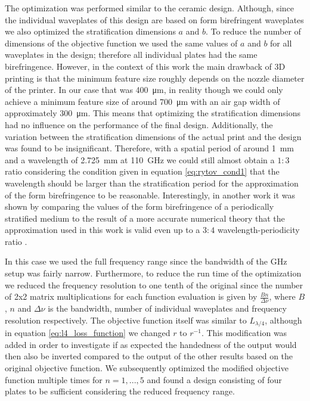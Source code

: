 The optimization was performed similar to the ceramic design. Although, since the individual waveplates of this design are based on form birefringent waveplates we also optimized the stratification dimensions $a$ and $b$. To reduce the number of dimensions of the objective function we used the same values of $a$ and $b$ for all waveplates in the design; therefore all individual plates had the same birefringence. However, in the context of this work the main drawback of 3D printing is that the minimum feature size roughly depends on the nozzle diameter of the printer. In our case that was \SI{400}{\micro \meter}, in reality though we could only achieve a minimum feature size of around \SI{700}{\micro \meter} with an air gap width of approximately \SI{300}{\micro \meter}. This means that optimizing the stratification dimensions had no influence on the performance of the final design. Additionally, the variation between the stratification dimensions of the actual print and the design was found to be insignificant. 
Therefore, with a spatial period of around \SI{1}{\milli \meter} and a wavelength of \SI{2.725}{\milli \meter} at \SI{110}{\giga \hertz} we could still almost obtain a $1:3$ ratio considering the condition given in equation \ref{eq:rytov_cond1} that the wavelength should be larger than the stratification period for the approximation of the form birefringence to be reasonable. Interestingly, in another work it was shown by comparing the values of the form birefringence of a periodically stratified medium to the result of a more accurate numerical theory that the approximation used in this work is valid even up to a $3:4$ wavelength-periodicity ratio \cite{Busch2016QuasioptischeT}.

In this case we used the full frequency range since the bandwidth of the GHz setup was fairly narrow. Furthermore, to reduce the run time of the optimization we reduced the frequency resolution to one tenth of the original since the number of 2x2 matrix multiplications for each function evaluation is given by $\frac{Bn}{\Delta \nu}$, where $B$, $n$ and $\Delta \nu$ is the bandwidth, number of individual waveplates and frequency resolution respectively. The objective function itself was similar to $L_{\lambda/4}$, although in equation \ref{eq:l4_loss_function} we changed $r$ to $r^{-1}$. This modification was added in order to investigate if as expected the handedness of the output would then also be inverted compared to the output of the other results based on the original objective function. We subsequently optimized the modified objective function multiple times for $n=1, ..., 5$ and found a design consisting of four plates to be sufficient considering the reduced frequency range. 

